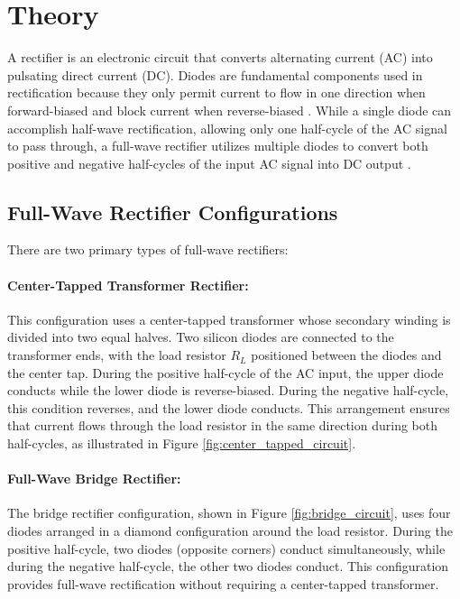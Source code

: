 \section{Theory}

A rectifier is an electronic circuit that converts alternating current (AC) into pulsating direct current (DC). Diodes are fundamental components used in rectification because they only permit current to flow in one direction when forward-biased and block current when reverse-biased \cite{lab04_mehta2012}. While a single diode can accomplish half-wave rectification, allowing only one half-cycle of the AC signal to pass through, a full-wave rectifier utilizes multiple diodes to convert both positive and negative half-cycles of the input AC signal into DC output \cite{lab04_boylestad2013}.

\subsection{Full-Wave Rectifier Configurations}

There are two primary types of full-wave rectifiers:

\paragraph{Center-Tapped Transformer Rectifier:}
This configuration uses a center-tapped transformer whose secondary winding is divided into two equal halves. Two silicon diodes are connected to the transformer ends, with the load resistor $R_L$ positioned between the diodes and the center tap. During the positive half-cycle of the AC input, the upper diode conducts while the lower diode is reverse-biased. During the negative half-cycle, this condition reverses, and the lower diode conducts. This arrangement ensures that current flows through the load resistor in the same direction during both half-cycles, as illustrated in Figure \ref{fig:center_tapped_circuit}.

\paragraph{Full-Wave Bridge Rectifier:}
The bridge rectifier configuration, shown in Figure \ref{fig:bridge_circuit}, uses four diodes arranged in a diamond configuration around the load resistor. During the positive half-cycle, two diodes (opposite corners) conduct simultaneously, while during the negative half-cycle, the other two diodes conduct. This configuration provides full-wave rectification without requiring a center-tapped transformer.


